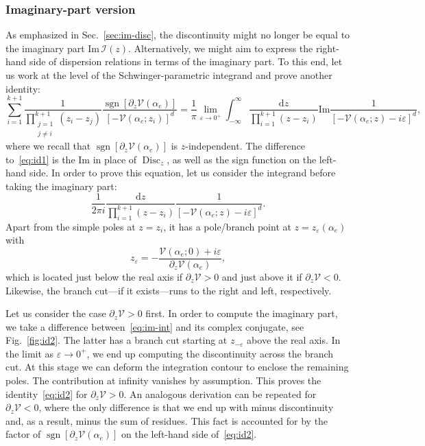 \documentclass[12pt]{article}
\numberwithin{figure}{section}
\DeclareMathOperator{\sgn}{sgn}
\DeclareMathOperator{\Disc}{Disc}
\def \be {\begin{equation}}
\def \ee {\end{equation}}
\def \d {\mathrm{d}}
\def \eps {\varepsilon}
\def \V {\mathcal{V}}
\def \I {\mathcal{I}}
\def \Im {\mathrm{Im}}
\begin{document}
    \subsubsection{Imaginary-part version}
    As emphasized in Sec.~\ref{sec:im-disc}, the discontinuity might no longer be equal to the imaginary part $\Im\, \I(z)$.
    Alternatively, we might aim to express the right-hand side of dispersion relations in terms of the imaginary part. To this end, let us work at the level of the Schwinger-parametric integrand and prove another identity:
    \be\label{eq:id2}
    \sum_{i=1}^{k+1} \frac{1}{\prod_{\substack{j=1\\ j\neq i}}^{k+1} (z_i - z_j)} \frac{\sgn [\partial_{z} \V(\alpha_e)]}{[-\V(\alpha_e; z_i)]^d} = \frac{1}{\pi}\lim_{\eps \to 0^+} \int_{-\infty}^{\infty} \frac{\d z}{\prod_{i=1}^{k+1}(z - z_i)} \Im \frac{1}{[-\V(\alpha_e; z) - i\eps]^d},
    \ee
    where we recall that $\sgn [\partial_{z} \V(\alpha_e)]$ is $z$-independent.
    The difference to~\eqref{eq:id1} is the $\Im$ in place of $\Disc_z$, as well as the sign function on the left-hand side.
    In order to prove this equation, let us consider the integrand before taking the imaginary part:
    \be\label{eq:im-int}
    \frac{1}{2\pi i}\frac{\d z}{\prod_{i=1}^{k+1}(z - z_i)} \frac{1}{[-\V(\alpha_e; z) - i\eps]^d}.
    \ee
    Apart from the simple poles at $z= z_i$, it has a pole/branch point at $z = z_\eps(\alpha_e)$ with
    \be
    z_{\eps} = -\frac{\V(\alpha_e;0) + i\eps}{\partial_z\V(\alpha_e)},
    \ee
    which is located just below the real axis if $\partial_z \V >0$ and just above it if $\partial_z \V < 0$. Likewise, the branch cut---if it exists---runs to the right and left, respectively.
    
    
    Let us consider the case $\partial_z \V > 0$ first.
    In order to compute the imaginary part, we take a difference between~\eqref{eq:im-int} and its complex conjugate, see Fig.~\ref{fig:id2}. The latter has a branch cut starting at $z_{-\eps}$ above the real axis. In the limit as $\eps \to 0^+$, we end up computing the discontinuity across the branch cut. At this stage we can deform the integration contour to enclose the remaining poles. The contribution at infinity vanishes by assumption. This proves the identity~\eqref{eq:id2} for $\partial_z \V > 0$. An analogous derivation can be repeated for $\partial_z \V <0$, where the only difference is that we end up with minus discontinuity and, as a result, minus the sum of residues. This fact is accounted for by the factor of $\sgn [\partial_z \V(\alpha_e)]$ on the left-hand side of~\eqref{eq:id2}.
    
\end{document}
